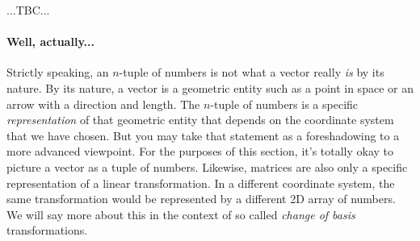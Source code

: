 ...TBC...






\paragraph{Well, actually...}
Strictly speaking, an $n$-tuple of numbers is not what a vector really \emph{is} by its nature. By its nature, a vector is a geometric entity such as a point in space or an arrow with a direction and length. The $n$-tuple of numbers is a specific \emph{representation} of that geometric entity that depends on the coordinate system that we have chosen. But you may take that statement as a foreshadowing to a more advanced viewpoint. For the purposes of this section, it's totally okay to picture a vector as a tuple of numbers. Likewise, matrices are also only a specific representation of a linear transformation. In a different coordinate system, the same transformation would be represented by a different 2D array of numbers. We will say more about this in the context of so called \emph{change of basis} transformations.

